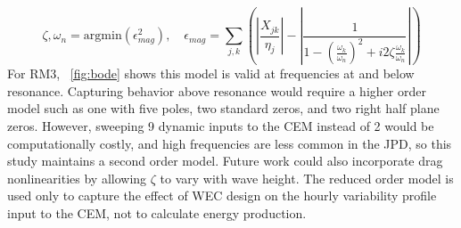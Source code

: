 \documentclass[10pt,twoside]{article}
\begin{document}
\begin{equation}\label{eq:bode-fit}
    \zeta,\omega_n = \mathrm{argmin}(\epsilon_{mag}^2), \quad
    \epsilon_{mag} = \sum_{j,k}^{} \left(\left|\frac{X_{jk}}{\eta_j}\right|-\left|\frac{1}{1-\left(\frac{\omega_k}{\omega_n}\right)^2 + i 2 \zeta \frac{\omega_k}{\omega_n}}\right|\right)
\end{equation}
For RM3, \figureautorefname~\ref{fig:bode} shows this model is valid at frequencies at and below resonance.
Capturing behavior above resonance would require a higher order model such as one with five poles, two standard zeros, and two right half plane zeros.
However, sweeping 9 dynamic inputs to the CEM instead of 2 would be computationally costly, and high frequencies are less common in the JPD, so this study maintains a second order model.
Future work could also incorporate drag nonlinearities by allowing $\zeta$ to vary with wave height.
The reduced order model is used only to capture the effect of WEC design on the hourly variability profile input to the CEM, not to calculate energy production.

\end{document}
